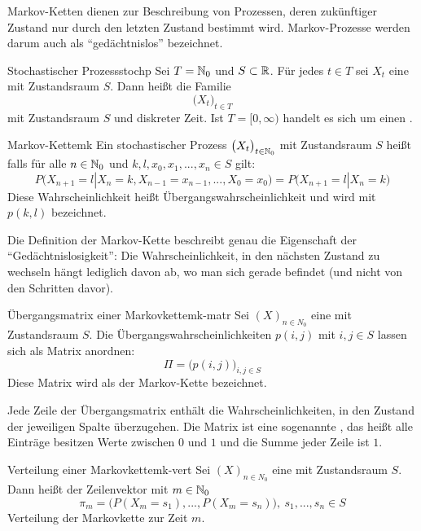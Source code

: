 Markov-Ketten dienen zur Beschreibung von Prozessen, deren zukünftiger Zustand
nur durch den letzten Zustand bestimmt wird. Markov-Prozesse werden darum auch
als "`gedächtnislos"' bezeichnet.

\begin{definition}{Stochastischer Prozess}{stochp}
Sei $T=\mathbb{N}_0$ und $S \subset\mathbb{R}$. Für jedes $t\in T$ sei $X_t$ eine
 mit Zustandsraum $S$. Dann heißt die Familie
\[
\big(X_t\big)_{t\in T}
\]
 mit Zustandsraum $S$ und diskreter Zeit. Ist
$T = [0, \infty)$ handelt es sich um einen .
\end{definition}

\begin{definition}{Markov-Kette}{mk}
Ein stochastischer Prozess $\big(X_t\big)_{t\in \mathbb{N}_0}$ mit Zustandsraum $S$
heißt  falls für alle $n\in\mathbb{N}_0$ und $k,l,x_0,x_1,...,x_n \in S$
gilt:
\[
P\big(X_{n+1} = l | X_{n}=k, X_{n-1}=x_{n-1},...,X_0=x_0\big) =
P\big(X_{n+1}=l|X_n=k\big)
\]
Diese Wahrscheinlichkeit heißt Übergangswahrscheinlichkeit und wird mit $p(k,l)$
bezeichnet.
\end{definition}

Die Definition der Markov-Kette beschreibt genau die Eigenschaft der
"`Gedächtnislosigkeit"': Die Wahrscheinlichkeit, in den nächsten Zustand zu
wechseln hängt lediglich davon ab, wo man sich gerade befindet (und nicht von
den Schritten davor).

\begin{definition}{Übergangsmatrix einer Markovkette}{mk-matr}
Sei $(X)_{n\in N_0}$ eine  mit Zustandsraum $S$. Die
Übergangswahrscheinlichkeiten $p(i,j)$ mit $i,j\in S$ lassen sich als Matrix
anordnen:
\[
\Pi = \big(p(i,j)\big)_{i,j\in S}
\]
Diese Matrix wird als  der Markov-Kette bezeichnet.
\end{definition}

Jede Zeile der Übergangsmatrix enthält die Wahrscheinlichkeiten, in den Zustand
der jeweiligen Spalte überzugehen. Die Matrix ist eine sogenannte
, das heißt alle Einträge besitzen Werte zwischen $0$
und $1$ und die Summe jeder Zeile ist $1$.

\begin{definition}{Verteilung einer Markovkette}{mk-vert}
Sei $(X)_{n\in N_0}$ eine  mit Zustandsraum $S$. Dann
heißt der Zeilenvektor mit $m\in \mathbb{N}_0$
\[
\pi_m = \big(P(X_m=s_1), ...,P(X_m=s_n)\big),\ s_1, ..., s_n \in S
\]
Verteilung der Markovkette zur Zeit $m$.
\end{definition}

